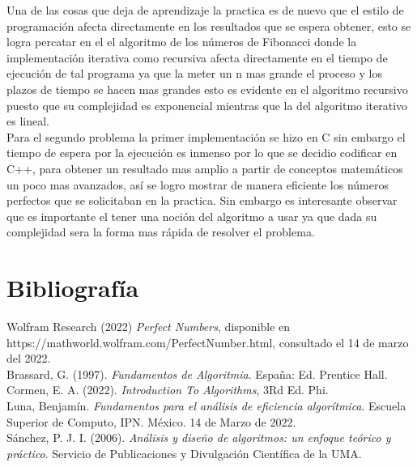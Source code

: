 \documentclass[12pt,twoside]{article}
\begin{document}
Una de las cosas que deja de aprendizaje la practica es de nuevo que el estilo de programaci\'on afecta directamente en los resultados que se espera obtener, esto se logra percatar en el el algoritmo de los n\'umeros de Fibonacci donde la implementación iterativa como recursiva afecta directamente en el tiempo de ejecuci\'on de tal programa ya que la meter un n mas grande el proceso y los plazos de tiempo se hacen mas grandes esto es evidente en el algoritmo recursivo puesto que su complejidad es exponencial mientras que la del algoritmo iterativo es  lineal.\\
Para el segundo problema la primer implementaci\'on se hizo en C sin embargo el tiempo de espera por la ejecuci\'on es inmenso por lo que se decidio codificar en C++, para obtener un resultado mas amplio a partir de conceptos matem\'aticos un poco mas avanzados, as\'i se logro mostrar de manera eficiente los n\'umeros perfectos que se solicitaban en la practica. Sin embargo es interesante observar que es importante el tener una noci\'on del algoritmo a usar ya que dada su complejidad sera la forma mas r\'apida de resolver el problema.


\section{Bibliograf\'ia}

Wolfram Research (2022) \textit{Perfect Numbers}, disponible en\\
https://mathworld.wolfram.com/PerfectNumber.html, consultado el 14 de marzo del 2022.\\[0.4cm]
Brassard, G. (1997). \textit {Fundamentos de Algoritmia}. España: Ed. Prentice Hall.\\[0.4cm]
Cormen, E. A. (2022). \textit{Introduction To Algorithms}, 3Rd Ed. Phi.\\[0.4cm]
Luna, Benjam\'in. \textit{Fundamentos para el an\'alisis de eficiencia algor\'itmica}. Escuela Superior de Computo, IPN. M\'exico. 14 de Marzo de 2022.\\[0.4cm]
S\'anchez, P. J. I. (2006). \textit{Análisis y diseño de algoritmos: un enfoque teórico y práctico}. Servicio de Publicaciones y Divulgación Científica de la UMA.
\end{document}
